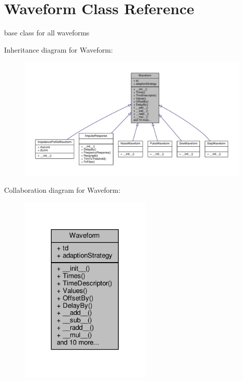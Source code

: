 \hypertarget{classSignalIntegrity_1_1TimeDomain_1_1Waveform_1_1Waveform_1_1Waveform}{}\section{Waveform Class Reference}
\label{classSignalIntegrity_1_1TimeDomain_1_1Waveform_1_1Waveform_1_1Waveform}


base class for all waveforms  




Inheritance diagram for Waveform\+:\nopagebreak
\begin{figure}[H]
\begin{center}
\leavevmode
\includegraphics[width=350pt]{classSignalIntegrity_1_1TimeDomain_1_1Waveform_1_1Waveform_1_1Waveform__inherit__graph}
\end{center}
\end{figure}


Collaboration diagram for Waveform\+:\nopagebreak
\begin{figure}[H]
\begin{center}
\leavevmode
\includegraphics[width=179pt]{classSignalIntegrity_1_1TimeDomain_1_1Waveform_1_1Waveform_1_1Waveform__coll__graph}
\end{center}
\end{figure}
